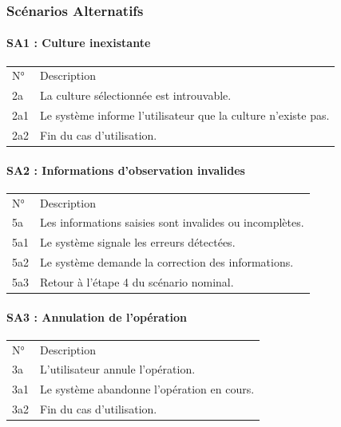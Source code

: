 \documentclass[
]{article}
\begin{document}
\hypertarget{scuxe9narios-alternatifs-2}{%
\subsubsection{Scénarios Alternatifs}\label{scuxe9narios-alternatifs-2}}

\hypertarget{sa1-culture-inexistante}{%
\paragraph{SA1 : Culture inexistante}\label{sa1-culture-inexistante}}

\begin{longtable}[]{@{}ll@{}}
\toprule
\endhead
N° & Description \\
2a & La culture sélectionnée est introuvable. \\
2a1 & Le système informe l'utilisateur que la culture n'existe pas. \\
2a2 & Fin du cas d'utilisation. \\
\bottomrule
\end{longtable}

\hypertarget{sa2-informations-dobservation-invalides}{%
\paragraph{SA2 : Informations d'observation
invalides}\label{sa2-informations-dobservation-invalides}}

\begin{longtable}[]{@{}ll@{}}
\toprule
\endhead
N° & Description \\
5a & Les informations saisies sont invalides ou incomplètes. \\
5a1 & Le système signale les erreurs détectées. \\
5a2 & Le système demande la correction des informations. \\
5a3 & Retour à l'étape 4 du scénario nominal. \\
\bottomrule
\end{longtable}

\hypertarget{sa3-annulation-de-lopuxe9ration-1}{%
\paragraph{SA3 : Annulation de
l'opération}\label{sa3-annulation-de-lopuxe9ration-1}}

\begin{longtable}[]{@{}ll@{}}
\toprule
\endhead
N° & Description \\
3a & L'utilisateur annule l'opération. \\
3a1 & Le système abandonne l'opération en cours. \\
3a2 & Fin du cas d'utilisation. \\
\bottomrule
\end{longtable}
\end{document}
